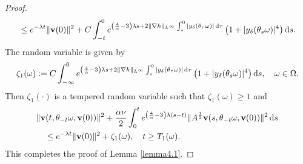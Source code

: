 \documentclass{elsarticle}
\theoremstyle{definition}
\numberwithin{equation}{section}
\renewcommand{\d}{{\rm{d}}}
\begin{document}
\begin{proof}
\begin{align*}
 &\quad\leq e^{-\lambda t}\|\textbf{v}(0)\|^2
 +C\int^0_{-t} e^{ \left( \frac 4 \alpha -3  \right) \lambda  s +2\|\nabla h\|_{L^\infty}\int_{s}^0 |y_{\delta}(\theta_\tau\omega)|\, \d \tau}  \left (1+|y_{\delta}(\theta_s\omega)|^4 \right) \d s. \nonumber
\end{align*}
The random variable is given by
\begin{align*}
 \zeta_1(\omega) :=C\int_{-\infty}^0  e^{ \left( \frac 4 \alpha -3  \right) \lambda  s +2\|\nabla h\|_{L^\infty}\int_{s}^0 |y_{\delta}(\theta_\tau\omega)|\, \d \tau}  \left (1+|y_{\delta}(\theta_s\omega)|^4 \right)   \d s,\quad \omega\in \Omega .
\end{align*}
Then $\zeta_1(\cdot)$ is a tempered random variable such that  $\zeta_1(\omega)\geq 1$ and
\begin{align}
&\|\textbf{v}(t,\theta_{-t} \omega, \textbf{v}(0))\|^2+ \frac {\alpha \nu } 2\int_0^t e^{ \left ( \frac{4}{\alpha} -3  \right) \lambda (s-t)}\|A^{\frac12}\textbf{v}(s, \theta_{-t}\omega, \textbf{v}(0))\|^2\, \d s \nonumber \\
 &\quad \leq e^{-\lambda t}\|\textbf{v}(0)\|^2
 + \zeta_1(\omega) ,\quad t\geq T_1(\omega).  \label{4.29}
\end{align}
This completes the proof of Lemma \ref{lemma4.1}.
\end{proof}
\end{document}

